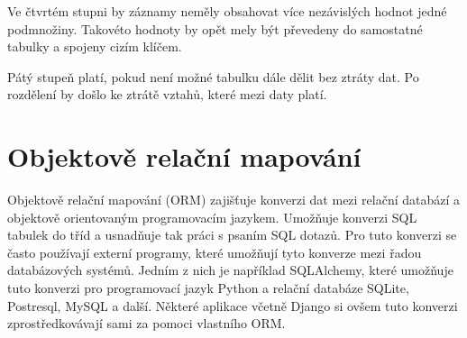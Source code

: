 Ve čtvrtém stupni by záznamy neměly obsahovat více nezávislých hodnot jedné podmnožiny. 
Takovéto hodnoty by opět mely být převedeny do samostatné tabulky a spojeny cizím klíčem.

Pátý stupeň platí, pokud není možné tabulku dále dělit bez ztráty dat. Po 
rozdělení by došlo ke ztrátě vztahů, které mezi daty platí. \cite{normalizace}



\section{Objektově relační mapování}

Objektově relační mapování (ORM) zajišťuje konverzi dat mezi relační
databází a objektově orientovaným programovacím jazykem. Umožňuje
konverzi SQL tabulek do tříd a usnadňuje tak práci s psaním SQL
dotazů. Pro tuto konverzi se často používají externí programy, které
umožňují tyto konverze mezi řadou databázových systémů. Jedním z nich
je například SQLAlchemy, které umožňuje tuto konverzi pro programovací
jazyk Python a relační databáze SQLite, Postresql, MySQL a
další. Některé aplikace včetně Django si ovšem tuto konverzi
zprostředkovávají sami za pomoci vlastního ORM. \cite{orm}
\cite{sqlalchemy}




















